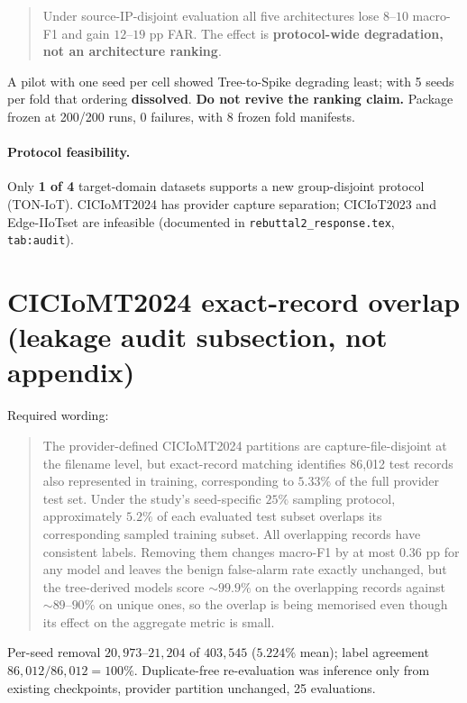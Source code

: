 \begin{quote}
Under source-IP-disjoint evaluation all five architectures lose $8$--$10$ macro-F1 and
gain $12$--$19$ pp FAR. The effect is \textbf{protocol-wide degradation, not an
architecture ranking}.
\end{quote}
A pilot with one seed per cell showed Tree-to-Spike degrading least; with 5 seeds per fold
that ordering \textbf{dissolved}. \textbf{Do not revive the ranking claim.} Package frozen
at 200/200 runs, 0 failures, with 8 frozen fold manifests.

\paragraph{Protocol feasibility.} Only \textbf{1 of 4} target-domain datasets supports a
new group-disjoint protocol (TON-IoT). CICIoMT2024 has provider capture separation;
CICIoT2023 and Edge-IIoTset are infeasible (documented in \texttt{rebuttal2\_response.tex},
\texttt{tab:audit}).

\section*{CICIoMT2024 exact-record overlap (leakage audit subsection, not appendix)}

Required wording:
\begin{quote}
The provider-defined CICIoMT2024 partitions are capture-file-disjoint at the filename
level, but exact-record matching identifies 86{,}012 test records also represented in
training, corresponding to $5.33\%$ of the full provider test set. Under the study's
seed-specific $25\%$ sampling protocol, approximately $5.2\%$ of each evaluated test
subset overlaps its corresponding sampled training subset. All overlapping records have
consistent labels. Removing them changes macro-F1 by at most $0.36$ pp for any model and
leaves the benign false-alarm rate exactly unchanged, but the tree-derived models score
$\sim99.9\%$ on the overlapping records against $\sim89$--$90\%$ on unique ones, so the
overlap is being memorised even though its effect on the aggregate metric is small.
\end{quote}

\noindent Per-seed removal $20{,}973$--$21{,}204$ of $403{,}545$ ($5.224\%$ mean); label
agreement $86{,}012/86{,}012 = 100\%$. Duplicate-free re-evaluation was inference only
from existing checkpoints, provider partition unchanged, 25 evaluations.

